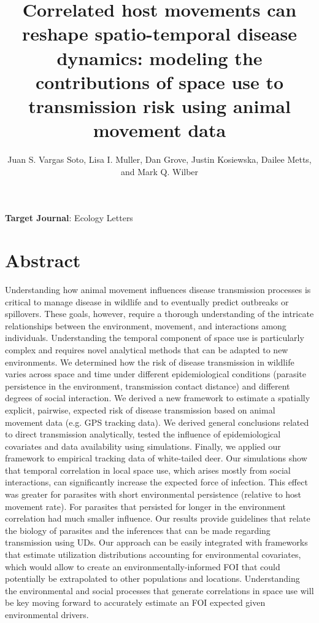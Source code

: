 \documentclass[letterpaper]{article}
\title{Correlated host movements can reshape spatio-temporal disease dynamics: modeling the contributions of space use to transmission risk using animal movement data}
\author{Juan S. Vargas Soto, Lisa I. Muller, Dan Grove, Justin Kosiewska, Dailee Metts, and Mark Q. Wilber}
\affil{School of Natural Resources, University of Tennessee, Knoxville, TN}
\date{}
\begin{document}
\maketitle

\noindent
\textbf{Target Journal}: Ecology Letters

\section*{Abstract}

Understanding how animal movement influences disease transmission processes is critical to manage disease in wildlife and to eventually predict outbreaks or spillovers. These goals, however, require a thorough understanding of the intricate relationships between the environment, movement, and interactions among individuals. Understanding the temporal component of space use is particularly complex and requires novel analytical methods that can be adapted to new environments. 
We determined how the risk of disease transmission in wildlife varies across space and time under different epidemiological conditions (parasite persistence in the environment, transmission contact distance) and different degrees of social interaction. We derived a new framework to estimate a spatially explicit, pairwise, expected risk of disease transmission based on animal movement data (e.g. GPS tracking data). We derived general conclusions related to direct transmission analytically, tested the influence of epidemiological covariates and data availability using simulations. Finally, we applied our framework to empirical tracking data of white-tailed deer. 
Our simulations show that temporal correlation in local space use, which arises mostly from social interactions, can significantly increase the expected force of infection. This effect was greater for parasites with short environmental persistence (relative to host movement rate). For parasites that persisted for longer in the environment correlation had much smaller influence.  
Our results provide guidelines that relate the biology of parasites and the inferences that can be made regarding transmission using UDs. 
Our approach can be easily integrated with frameworks that estimate utilization distributions accounting for environmental covariates, which would allow to create an environmentally-informed FOI that could potentially be extrapolated to other populations and locations. Understanding the environmental and social processes that generate correlations in space use will be key moving forward to accurately estimate an FOI expected given environmental drivers. 
\end{document}
